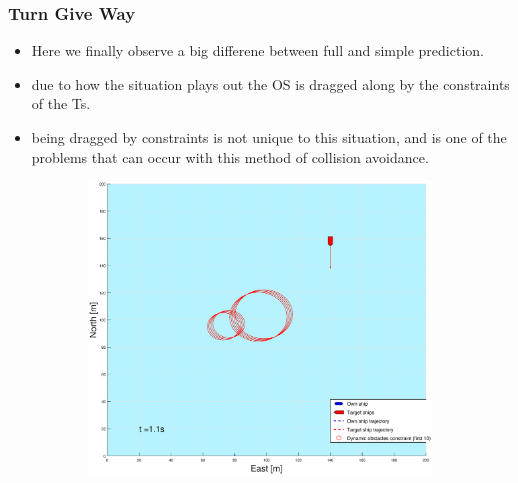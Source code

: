 \subsubsection{Turn Give Way}
\begin{itemize}
    \item Here we finally observe a big differene between full and simple prediction.
    \item due to how the situation plays out the \gls{OS} is dragged along by the constraints of the \gls{Ts}.
    \item being dragged by constraints is not unique to this situation, and is one of the problems that can occur
    with this method of collision avoidance.
\end{itemize}

\clearpage
\begin{figure}[!b] %
    \begin{subfigure}[b]{0.49\textwidth}
        \centering
        \includegraphics[width=\textwidth]{Images/Figures/sving_GW/_Simple_0fig1_time=1}
    \end{subfigure}
    \hfill
    \begin{subfigure}[b]{0.499\textwidth}
        \centering

\end{subfigure}
\end{figure}
